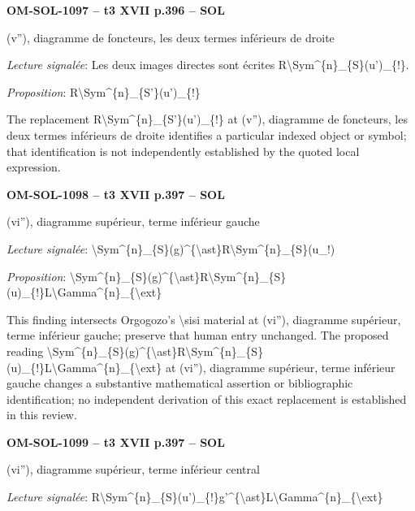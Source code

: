 \par\noindent\textbf{OM-SOL-1097 -- t3 XVII p.396 -- SOL}\par
(v''), diagramme de foncteurs, les deux termes inférieurs de droite\par
\emph{Lecture signalée}: Les deux images directes sont écrites R\textbackslash{}Sym\textasciicircum{}\{n\}\_\{S\}(u')\_\{!\}.\par
\emph{Proposition}: R\textbackslash{}Sym\textasciicircum{}\{n\}\_\{S'\}(u')\_\{!\}\par
The replacement R\textbackslash{}Sym\textasciicircum{}\{n\}\_\{S'\}(u')\_\{!\} at (v''), diagramme de foncteurs, les deux termes inférieurs de droite identifies a particular indexed object or symbol; that identification is not independently established by the quoted local expression.\par
\par\noindent\textbf{OM-SOL-1098 -- t3 XVII p.397 -- SOL}\par
(vi''), diagramme supérieur, terme inférieur gauche\par
\emph{Lecture signalée}: \textbackslash{}Sym\textasciicircum{}\{n\}\_\{S\}(g)\textasciicircum{}\{\textbackslash{}ast\}R\textbackslash{}Sym\textasciicircum{}\{n\}\_\{S\}(u\_!)\par
\emph{Proposition}: \textbackslash{}Sym\textasciicircum{}\{n\}\_\{S\}(g)\textasciicircum{}\{\textbackslash{}ast\}R\textbackslash{}Sym\textasciicircum{}\{n\}\_\{S\}(u)\_\{!\}L\textbackslash{}Gamma\textasciicircum{}\{n\}\_\{\textbackslash{}ext\}\par
This finding intersects Orgogozo's \textbackslash{}sisi material at (vi''), diagramme supérieur, terme inférieur gauche; preserve that human entry unchanged. The proposed reading \textbackslash{}Sym\textasciicircum{}\{n\}\_\{S\}(g)\textasciicircum{}\{\textbackslash{}ast\}R\textbackslash{}Sym\textasciicircum{}\{n\}\_\{S\}(u)\_\{!\}L\textbackslash{}Gamma\textasciicircum{}\{n\}\_\{\textbackslash{}ext\} at (vi''), diagramme supérieur, terme inférieur gauche changes a substantive mathematical assertion or bibliographic identification; no independent derivation of this exact replacement is established in this review.\par
\par\noindent\textbf{OM-SOL-1099 -- t3 XVII p.397 -- SOL}\par
(vi''), diagramme supérieur, terme inférieur central\par
\emph{Lecture signalée}: R\textbackslash{}Sym\textasciicircum{}\{n\}\_\{S\}(u')\_\{!\}g'\textasciicircum{}\{\textbackslash{}ast\}L\textbackslash{}Gamma\textasciicircum{}\{n\}\_\{\textbackslash{}ext\}\par
